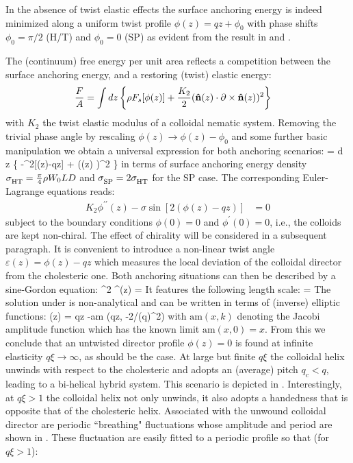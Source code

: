In the absence of twist elastic effects the surface anchoring energy is indeed minimized along a uniform twist profile $\phi(z) = qz + \phi_{0} $ with phase shifts $\phi_{0} = \pi/2$ (H/T) and $\phi_{0} = 0$ (SP) as evident from the result in  and .


The (continuum) free energy per unit area reflects a competition between the surface anchoring energy, and a restoring (twist) elastic energy:
\begin{align}
\frac{F}{A} &= \int d z \left \{ \rho F_{s}[\phi(z)]  + \frac{K_{2}}{2} ({\bf \hat{n}}(z) \cdot \partial \times {\bf \hat{n}}(z) )^{2} \right \}
\end{align}
with $K_{2}$ the twist elastic modulus of a colloidal nematic system.
Removing the trivial phase angle by rescaling $\phi(z) \rightarrow \phi(z) - \phi_{0}$ and some further basic manipulation we obtain a universal expression for both anchoring scenarios:
\beq
{} = \int d z \left \{ -\sigma \cos^{2}[\phi(z)-qz] +  (\partial \phi(z)  )^{2} \right \}
\label{freedens}
\eeq
in terms of surface anchoring energy density $\sigma_{\ds \rm HT} = \tfrac{\pi}{4} \rho W_{0}LD$ and $\sigma_{\ds \rm SP} = 2 \sigma_{\ds \rm HT}$ for the SP case. The corresponding Euler-Lagrange equations reads:
\begin{align}
 K_{2}\phi^{\prime \prime}(z) - \sigma \sin[2 ( \phi(z)- qz)]&=0
 \label{nlde}
 \end{align}
subject to the boundary conditions $\phi(0) = 0$ and $\phi^{\prime}(0) = 0$, i.e., the colloids are kept non-chiral. The effect of chirality will be considered in a subsequent paragraph.
It is convenient to introduce a non-linear twist angle $\varepsilon(z) = \phi(z) - qz$ which measures the local deviation of the colloidal director from the cholesteric one. Both anchoring situations can then be described by a sine-Gordon equation:
\beq
 \xi^{2} \varepsilon^{\prime \prime}(z) = \sin[2\varepsilon(z) ]
\label{diffeps}
\eeq
It features the following length scale:
\beq
\xi = 
\eeq
The  solution under is non-analytical and can be written in terms of (inverse) elliptic functions:
\beq
\phi(z) = qz -\textrm{am} (qz, -2/(q\xi)^{2})
\label{jaf}
\eeq
with $\textrm{am}(x,k)$ denoting the Jacobi amplitude function which has the known limit $ \textrm{am}(x,0) = x$. From this we conclude that an untwisted director profile $\phi(z) = 0$ is found at infinite elasticity $q\xi \rightarrow \infty$, as should be the case. At large but finite $q\xi$ the colloidal helix unwinds with respect to the cholesteric and adopts an (average) pitch $q_{c} <q$, leading to a bi-helical hybrid system. This scenario is depicted in . Interestingly, at $q\xi >1$ the colloidal helix not only unwinds, it also adopts a handedness that is opposite that of the cholesteric helix.  Associated with the unwound colloidal director are periodic ``breathing" fluctuations whose amplitude and period are shown in .  These fluctuation are easily fitted to a periodic profile so that (for $q \xi >1$):
